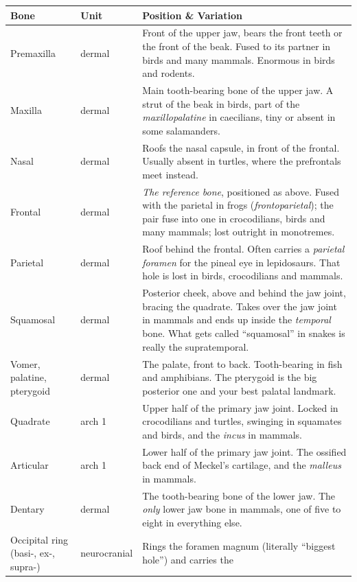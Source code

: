 \documentclass[11pt]{article}
\newcommand{\term}[1]{\textsl{#1}}
\begin{document}
\begingroup\footnotesize
\begin{xltabular}{\linewidth}{L{2.3cm} L{1.5cm} X}
\toprule
\textbf{Bone} & \textbf{Unit} & \textbf{Position \& Variation} \\
\midrule
\endhead
Premaxilla & dermal &
  Front of the upper jaw, bears the front teeth or the front of the beak.
  Fused to its partner in birds and many mammals. Enormous in birds and
  rodents. \\
Maxilla & dermal &
  Main tooth-bearing bone of the upper jaw. A strut of the beak in birds, part
  of the \term{maxillopalatine} in caecilians, tiny or absent in some salamanders. \\
Nasal & dermal &
  Roofs the nasal capsule, in front of the frontal. Usually absent in turtles,
  where the prefrontals meet instead. \\
Frontal & dermal &
  \emph{The reference bone}, positioned as above. Fused with
  the parietal in frogs (\term{frontoparietal}); the pair fuse into one in
  crocodilians, birds and many mammals; lost outright in monotremes. \\
Parietal & dermal &
  Roof behind the frontal. Often carries a \term{parietal foramen} for the
  pineal eye in lepidosaurs. That hole is lost in birds, crocodilians and mammals. \\
Squamosal & dermal &
  Posterior cheek, above and behind the jaw joint, bracing the quadrate. Takes
  over the jaw joint in mammals and ends up inside the \term{temporal} bone.
  What gets called ``squamosal'' in snakes is really the supratemporal. \\
Vomer, palatine, pterygoid & dermal &
  The palate, front to back. Tooth-bearing in fish and amphibians. The
  pterygoid is the big posterior one and your best palatal landmark. \\
Quadrate & arch 1 &
  Upper half of the primary jaw joint. Locked in crocodilians and turtles,
  swinging in squamates and birds, and the \term{incus} in mammals. \\
Articular & arch 1 &
  Lower half of the primary jaw joint. The ossified back end of Meckel's
  cartilage, and the \term{malleus} in mammals. \\
Dentary & dermal &
  The tooth-bearing bone of the lower jaw. The \emph{only} lower jaw bone in
  mammals, one of five to eight in everything else. \\
Occipital ring \newline (basi-, ex-, supra-) & neurocranial &
  Rings the foramen magnum (literally ``biggest hole'') and carries the

\end{xltabular}
\end{document}

